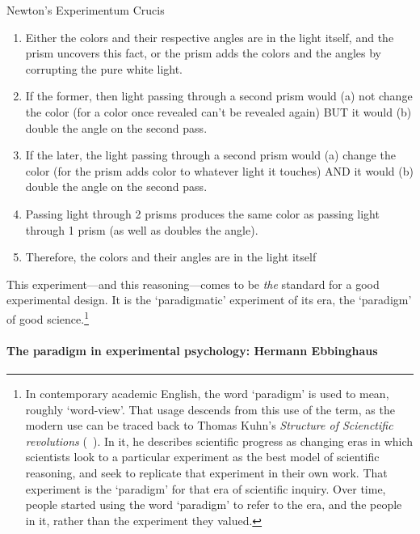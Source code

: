 \begin{refsection}
\begin{apatextbox}{Newton’s Experimentum Crucis} 

\begin{enumerate}
\item Either the colors and their respective angles are in the light itself, and the prism uncovers this fact, or the prism adds the colors and the angles by corrupting the pure white light.

\item If the former, then light passing through a second prism would (a) not change the color (for a color once revealed can’t be revealed again) BUT it would (b) double the angle on the second pass.

\item If the later, the light passing through a second prism would (a) change the color (for the prism adds color to whatever light it touches) AND it would (b) double the angle on the second pass.

\item Passing light through 2 prisms produces the same color as passing light through 1 prism (as well as doubles the angle).

\item Therefore, the colors and their angles are in the light itself 

\end{enumerate}

\end{apatextbox}

This experiment---and this reasoning---comes to be \emph{the} standard for a good experimental design. It is the ‘paradigmatic’ experiment of its era, the ‘paradigm’ of good science.\footnote{In contemporary academic English, the word ‘paradigm’ is used to mean, roughly ‘word-view’. That usage descends from this use of the term, as the modern use can be traced back to Thomas Kuhn’s \emph{Structure of Scienctific revolutions} (~\citep{Kuhn:1996fi}). In it, he describes scientific progress as changing eras in which scientists look to a particular experiment as the best model of scientific reasoning, and seek to replicate that experiment in their own work. That experiment is the ‘paradigm’ for that era of scientific inquiry. Over time, people started using the word ‘paradigm’ to refer to the era, and the people in it, rather than the experiment they valued.} 

\paragraph{The paradigm in experimental psychology: Hermann Ebbinghaus}
\label{theparadigminexperimentalpsychology:hermannebbinghaus}


\end{refsection}
